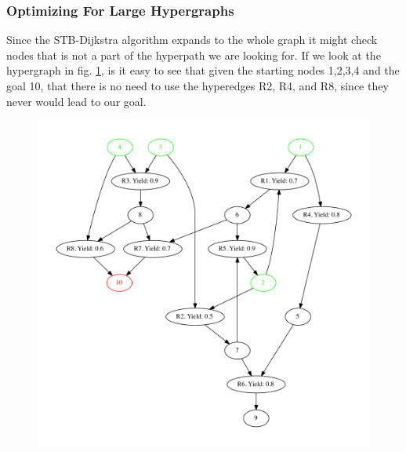 \documentclass[a4paper,10pt,titlepage]{paper}
\begin{document}
\subsubsection{Optimizing For Large Hypergraphs}\label{Pruning}
Since the STB-Dijkstra algorithm expands to the whole graph it might check nodes that is not a part of the hyperpath we are looking for. If we look at the hypergraph in fig. \ref{fig::DeadEnd}, is it easy to see that given the starting nodes 1,2,3,4 and the goal 10, that there is no need to use the hyperedges R2, R4, and R8, since they never would lead to our goal.
\begin{figure}[H]
\centering
\includegraphics[scale=0.4]{Billeder/DeadEnd.pdf}
\caption{}
\label{fig::DeadEnd}
\end{figure}
\end{document}
